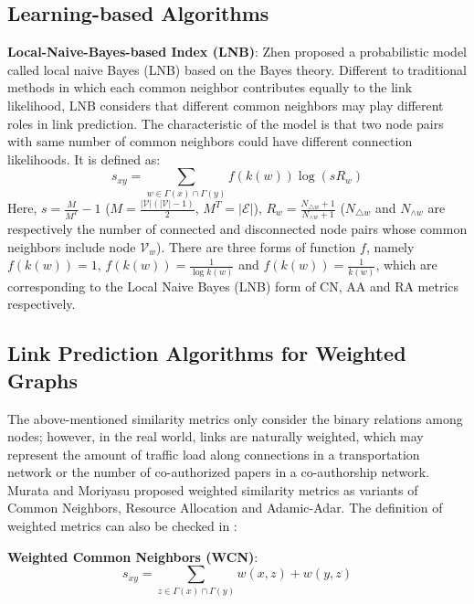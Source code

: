 \documentclass[\main/thesis.tex]{subfiles}
\begin{document}
\subsection{Learning-based Algorithms}
\textbf{Local-Naive-Bayes-based Index (LNB)}: Zhen \cite{liu2011link} proposed a probabilistic model called local naive Bayes (LNB) based on the Bayes theory. Different to traditional methods in which each common neighbor contributes equally to the link likelihood, LNB considers that different common neighbors may play different roles in link prediction. The characteristic of the model is that two node pairs with same number of common neighbors could have different connection likelihoods. It is defined as:
\begin{equation}
s_{xy} = \sum_{w\in \Gamma(x)\cap\Gamma(y)}f(k(w))\log(sR_w)
\end{equation}
Here, $s=\frac{M}{M^T}-1$ ($M=\frac{|\mathcal{V}|(|\mathcal{V}|-1)}{2}$, $M^T=|\mathcal{E}|$), $R_w=\frac{N_{\triangle w}+1}{N_{\wedge w}+1}$ ($N_{\triangle w}$ and $N_{\wedge w}$ are respectively the number of connected and disconnected node pairs whose common neighbors include node $\mathcal{V}_w$). There are three forms of function $f$, namely $f(k(w))=1$, $f(k(w))=\frac{1}{\log k(w)}$ and $f(k(w))=\frac{1}{k(w)}$, which are corresponding to the Local Naive Bayes (LNB) form of CN, AA and RA metrics respectively.

\subsection{Link Prediction Algorithms for Weighted Graphs}
The above-mentioned similarity metrics only consider the binary relations among nodes; however, in the real world, links are naturally weighted, which may represent the amount of traffic load along connections in a transportation network or the number of co-authorized papers in a co-authorship network. Murata and Moriyasu \cite{murata2007link} proposed weighted similarity metrics as variants of Common Neighbors, Resource Allocation and Adamic-Adar. The definition of weighted metrics can also be checked in \cite{lu2010link}:

\textbf{Weighted Common Neighbors (WCN)}:
\begin{equation}
s_{xy}=\sum_{z\in \Gamma(x)\cap\Gamma(y)}w(x,z)+w(y,z)
\end{equation}
\end{document}
